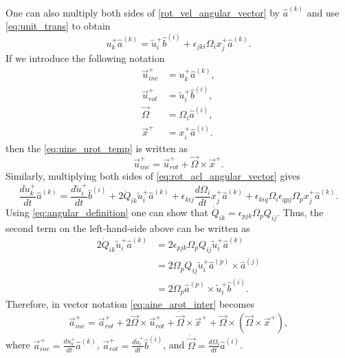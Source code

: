 \documentclass[oneside,a4paper,11pt]{report}
\begin{document}
One can also multiply both sides of \cref{rot_vel_angular_vector} by $\hat{a}^{(k)}$ and use \cref{eq:unit_trans} to obtain
\begin{equation}
    \label{eq:uine_urot_temp}
u^+_k \hat{a}^{(k)} = \tilde{u}^+_i \hat{b}^{(i)} + \epsilon_{jki}\Omega_ix^+_j \hat{a}^{(k)}.
\end{equation}
If we introduce the following notation
\begin{align}
    \vec{u}^+_{ine} &= u^+_k \hat{a}^{(k)}, \\
    \vec{u}^+_{rot} &= \tilde{u}^+_i \hat{b}^{(i)}, \\
    \vec{\Omega} &= \Omega_i \hat{a}^{(i)}, \\
    \vec{x}^+ &= x_i^+ \hat{a}^{(i)}.
\end{align}
then the \cref{eq:uine_urot_temp} is written as 
\begin{equation}
\label{uine_urot}
\vec{u}^+_{ine}  = \vec{u}^+_{rot}  + \vec{\Omega} \times \vec{x}^+.
\end{equation}
Similarly, multiplying both sides of \cref{eq:rot_acl_angular_vector} gives
\begin{equation}
\label{eq:aine_arot_inter}
    \frac{du^+_k}{dt} \hat{a}^{(k)} = \frac{d\tilde{u}^+_i}{dt}\hat{b}^{(i)} + 2 \dot{Q}_{ik} \tilde{u}^+_i \hat{a}^{(k)} + \epsilon_{kij}\frac{d \Omega_{i}}{dt} x^+_j \hat{a}^{(k)} + \epsilon_{kiq}\Omega_{i} \epsilon_{qpj}\Omega_{p} x^+_j \hat{a}^{(k)}.
\end{equation}
Using \cref{eq:angular_definition} one can show that $\dot{Q}_{ik} = \epsilon_{pjk} \Omega_p Q_{ij}$. Thus, the second term on the left-hand-side above can be written as
\begin{align}
    2 \dot{Q}_{ik} \tilde{u}^+_i \hat{a}^{(k)} &= 2 \epsilon_{pjk} \Omega_p Q_{ij} \tilde{u}^+_i \hat{a}^{(k)} \nonumber \\
    &= 2 \Omega_p Q_{ij} \tilde{u}^+_i \hat{a}^{(p)} \times \hat{a}^{(j)} \nonumber \\
    &= 2 \Omega_p \hat{a}^{(p)} \times \tilde{u}^+_i \hat{b}^{(i)}.
\end{align}
Therefore, in vector notation \cref{eq:aine_arot_inter} becomes
\begin{equation}
    \label{eq:aine_arot}
    \vec{a}^+_{ine} = \vec{a}^+_{rot} + 2 \vec{\Omega} \times \vec{u}^+_{rot} + \dot{\vec{\Omega}} \times \vec{x}^+ + \vec{\Omega} \times (\vec{\Omega} \times \vec{x}^+),
\end{equation}
where $\vec{a}^+_{ine} = \frac{du^+_k}{dt} \hat{a}^{(k)}$, $\vec{a}^+_{rot} = \frac{d\tilde{u}^+_i}{dt}\hat{b}^{(i)}$, and $\dot{\vec{\Omega}} = \frac{d\Omega_i}{dt} \hat{a}^{(i)}$.
\end{document}
